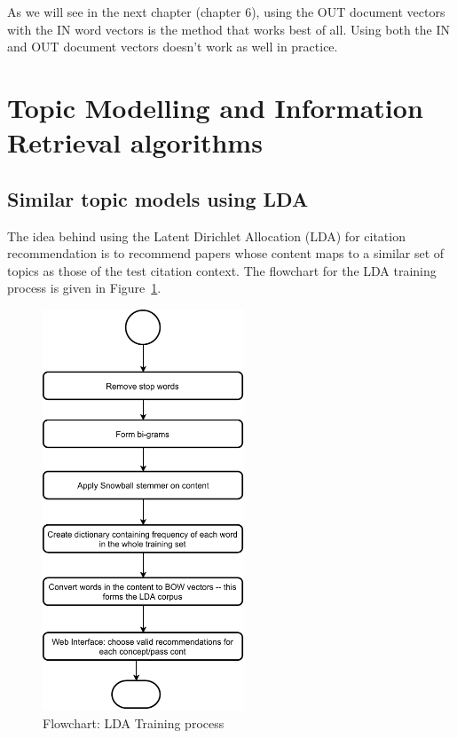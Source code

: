 As we will see in the next chapter (chapter 6), using the OUT document vectors with the IN word vectors is the method that works best of all. Using both the IN and OUT document vectors doesn't work as well in practice.
\section{Topic Modelling and Information Retrieval algorithms}
\subsection{Similar topic models using LDA}
The idea behind using the Latent Dirichlet Allocation (LDA) \cite{BleiNJ03} for citation recommendation is to recommend papers whose content maps to a similar set of topics as those of the test citation context. The flowchart for the LDA training process is given in Figure~\ref{fig:ldatrainingflowchart}.
\begin{figure}[h]
\centering
     \includegraphics[width=6cm]{figures/Approach/LDAtrainingflowchart.pdf}
  \caption{Flowchart: LDA Training process}
  \label{fig:ldatrainingflowchart}
\end{figure}
